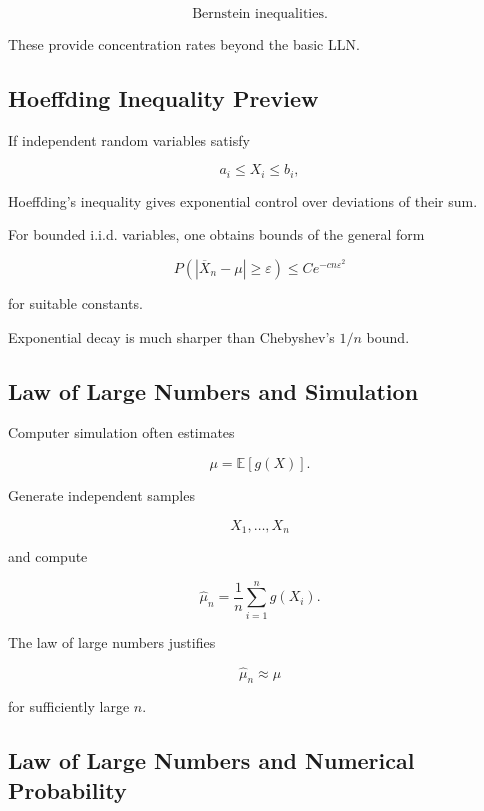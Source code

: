 \[
\boxed{
\text{Bernstein inequalities}.
}
\]

These provide concentration rates beyond the basic LLN.

\subsection{Hoeffding Inequality Preview}
\label{subsec:hoeffding-lln-preview}

If independent random variables satisfy

\[
a_i\leq X_i\leq b_i,
\]

Hoeffding's inequality gives exponential control over deviations of their
sum.

For bounded i.i.d. variables, one obtains bounds of the general form

\[
\boxed{
P
\left(
|\overline{X}_n-\mu|
\geq
\varepsilon
\right)
\leq
C e^{-cn\varepsilon^2}
}
\]

for suitable constants.

Exponential decay is much sharper than Chebyshev's \(1/n\) bound.

\subsection{Law of Large Numbers and Simulation}
\label{subsec:lln-simulation}

Computer simulation often estimates

\[
\mu
=
\mathbb{E}[g(X)].
\]

Generate independent samples

\[
X_1,\ldots,X_n
\]

and compute

\[
\boxed{
\widehat{\mu}_n
=
\frac1n
\sum_{i=1}^{n}
g(X_i).
}
\]

The law of large numbers justifies

\[
\widehat{\mu}_n
\approx
\mu
\]

for sufficiently large \(n\).

\subsection{Law of Large Numbers and Numerical Probability}
\label{subsec:lln-numerical-probability}


